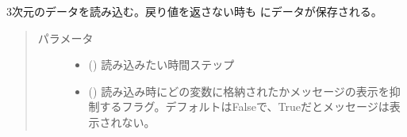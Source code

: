 \documentclass[letterpaper,10pt,dvipdfmx,report]{sphinxmanual}
\begin{document}
\begin{fulllineitems}
\label{\detokenize{io:R2D2.R2D2_data.read_qq}}
3次元のデータを読み込む。戻り値を返さない時も {\hyperref[\detokenize{io:R2D2.R2D2_data.qq}]{}} にデータが保存される。
\begin{quote}\begin{description}
\item[{パラメータ}] \leavevmode\begin{itemize}
\item {} 
 () \sphinxhyphen{}\sphinxhyphen{} 読み込みたい時間ステップ

\item {} 
 () \sphinxhyphen{}\sphinxhyphen{} 読み込み時にどの変数に格納されたかメッセージの表示を抑制するフラグ。デフォルトはFalseで、Trueだとメッセージは表示されない。

\end{itemize}

\end{description}\end{quote}

\end{fulllineitems}

\end{document}
